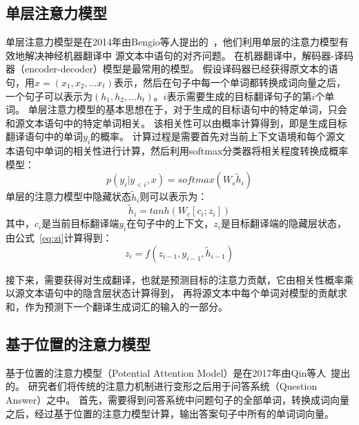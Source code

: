 \subsection{单层注意力模型}
单层注意力模型是在2014年由Bengio等人提出的~，他们利用单层的注意力模型有效地解决神经机器翻译中
源文本中语句的对齐问题。
在机器翻译中，解码器-译码器（encoder-decoder）模型是最常用的模型。
假设译码器已经获得原文本的语句，用${x=\left ( x_{1},x_{2},...x_{t} \right )}$表示，然后在句子中每一个单词都转换成词向量之后，
一个句子可以表示为${\left ( h_{1},h_{2},...h_{t} \right )}$。${i}$表示需要生成的目标翻译句子的第${i}$个单词。
单层注意力模型的基本思想在于，对于生成的目标语句中的特定单词，只会和源文本语句中的特定单词相关。
该相关性可以由概率计算得到，即是生成目标翻译语句中的单词${y_{i}}$的概率。
计算过程是需要首先对当前上下文语境和每个源文本语句中单词的相关性进行计算，然后利用softmax分类器将相关程度转换成概率模型：
\begin{equation}
p\left ( y_{i}|y_{<i},x \right )=softmax\left ( W_{s}\widetilde{h}_{i} \right )
\end{equation}
单层的注意力模型中隐藏状态${\widetilde{h}_{i}}$则可以表示为：
\begin{equation}
\widetilde{h}_{i}=tanh\left ( W_{c}\left [ c_{i};z_{i} \right ] \right )
\end{equation}
其中，${c_{i}}$是当前目标翻译端${y_{i}}$在句子中的上下文，${z_{i}}$是目标翻译端的隐藏层状态，由公式~\ref{eq:zi}计算得到：
\begin{equation}
z_{i}=f\left ( z_{i-1},y_{i-1},\widetilde{h}_{i-1} \right )
\label{eq:zi}
\end{equation}

接下来，需要获得对生成翻译，也就是预测目标的注意力贡献，它由相关性概率乘以源文本语句中的隐含层状态计算得到，
再将源文本中每个单词对模型的贡献求和，作为预测下一个翻译生成词汇的输入的一部分。

\subsection{基于位置的注意力模型}

基于位置的注意力模型（Potential Attention Model）是在2017年由Qin等人~提出的。
研究者们将传统的注意力机制进行变形之后用于问答系统（Question Answer）之中。
首先，需要得到问答系统中问题句子的全部单词，转换成词向量之后，经过基于位置的注意力模型计算，输出答案句子中所有的单词词向量。

